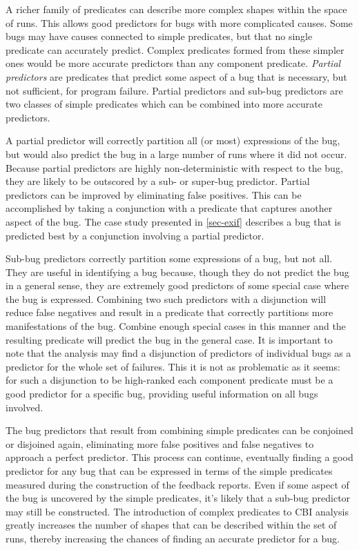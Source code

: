 A richer family of predicates can describe more complex shapes within the space of runs.  This allows good predictors for bugs with more complicated causes.  Some bugs may have causes connected to simple predicates, but that no single predicate can accurately predict.  Complex predicates formed from these simpler ones would be more accurate predictors than any component predicate.  \emph{Partial predictors} are predicates that predict some aspect of a bug that is necessary, but not sufficient, for program failure.  Partial predictors and sub-bug predictors are two classes of simple predicates which can be combined into more accurate predictors.

A partial predictor will correctly partition all (or most) expressions of the bug, but would also predict the bug in a large number of runs where it did not occur.  Because partial predictors are highly non-deterministic with respect to the bug, they are likely to be outscored by a sub- or super-bug predictor.  Partial predictors can be improved by eliminating false positives.  This can be accomplished by taking a conjunction with a predicate that captures another aspect of the bug.  The case study presented in \autoref{sec-exif} describes a bug that is predicted best by a conjunction involving a partial predictor.

Sub-bug predictors correctly partition some expressions of a bug, but not all.  They are useful in identifying a bug because, though they do not predict the bug in a general sense, they are extremely good predictors of some special case where the bug is expressed.  Combining two such predictors with a disjunction will reduce false negatives and result in a predicate that correctly partitions more manifestations of the bug.  Combine enough special cases in this manner and the resulting predicate will predict the bug in the general case.  It is important to note that the analysis may find a disjunction of predictors of individual bugs as a predictor for the whole set of failures.  This it is not as problematic as it seems: for such a disjunction to be high-ranked each component predicate must be a good predictor for a specific bug, providing useful information on all bugs involved.

The bug predictors that result from combining simple predicates can be conjoined or disjoined again, eliminating more false positives and false negatives to approach a perfect predictor.  This process can continue, eventually finding a good predictor for any bug that can be expressed in terms of the simple predicates measured during the construction of the feedback reports.  Even if some aspect of the bug is uncovered by the simple predicates, it's likely that a sub-bug predictor may still be constructed.  The introduction of complex predicates to CBI analysis greatly increases the number of shapes that can be described within the set of runs, thereby increasing the chances of finding an accurate predictor for a bug.

